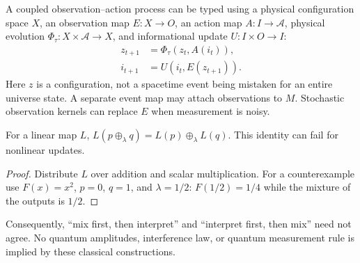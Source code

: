\documentclass[12pt]{article}
\begin{document}
A coupled observation--action process can be typed using a physical configuration space $X$, an observation map $E:X\to O$, an action map $A:I\to\mathcal A$, physical evolution $\Phi_\tau:X\times\mathcal A\to X$, and informational update $U:I\times O\to I$:
\begin{align}z_{t+1}&=\Phi_\tau(z_t,A(i_t)),\\i_{t+1}&=U(i_t,E(z_{t+1})).\end{align}
Here $z$ is a configuration, not a spacetime event being mistaken for an entire universe state. A separate event map may attach observations to $M$. Stochastic observation kernels can replace $E$ when measurement is noisy.

\begin{proposition}
For a linear map $L$, $L(p\oplus_\lambda q)=L(p)\oplus_\lambda L(q)$. This identity can fail for nonlinear updates.
\end{proposition}
\begin{proof}Distribute $L$ over addition and scalar multiplication. For a counterexample use $F(x)=x^2$, $p=0$, $q=1$, and $\lambda=1/2$: $F(1/2)=1/4$ while the mixture of the outputs is $1/2$.\end{proof}
Consequently, ``mix first, then interpret'' and ``interpret first, then mix'' need not agree. No quantum amplitudes, interference law, or quantum measurement rule is implied by these classical constructions.
\end{document}
